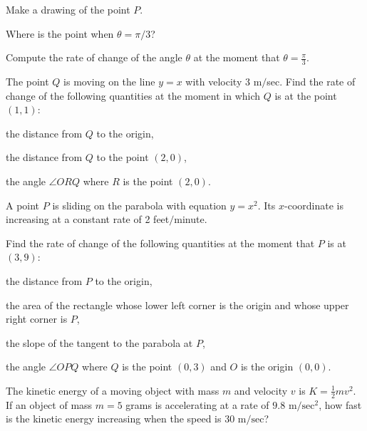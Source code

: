 \begin{multicols}{2}
\endanswer
\subprob  Make a drawing of the point $P$.




\subprob  Where is the point when $\theta=\pi/3$?




\subprob  Compute the rate of change of the angle $\theta$ at the moment
that $\theta=\frac\pi3$.












\problem The point $Q$ is moving on the line $y=x$ with velocity 3 m$/$sec. 
Find the rate of change of the following quantities at the moment in which
$Q$ is at the point $(1,1)$:




\subprob the distance from $Q$ to the origin,




\subprob the distance from $Q$ to the point $(2,0)$,




\subprob the angle $\angle ORQ$ where $R$ is the point $(2,0)$.








\problem A point $P$ is sliding on the parabola with equation $y=x^2$.  Its 
$x$-coordinate is increasing at a constant rate of 2 feet$/$minute.




Find the rate of change of the following quantities at the moment that
$P$ is at $(3, 9)$:




\subprob the distance from $P$ to the origin,




\subprob the area of the rectangle whose lower left corner is the origin
and whose upper right corner is $P$,




\subprob the slope of the tangent to the parabola at $P$,




\subprob the angle $\angle OPQ$ where $Q$ is the point $(0, 3)$ and $O$ is the origin $(0,0)$.




\problem \subprob The kinetic energy of a moving object with mass $m$ and velocity $v$ is $K=\frac{1}{2}mv^2$. 
If an object of mass $m=5$ grams is accelerating at a rate of $9.8$
$\textrm{m}/{\textrm{sec}^2}$, how fast is the kinetic energy increasing when
the speed is $30$ $\textrm{m}/\textrm{sec}$?





\end{multicols}
